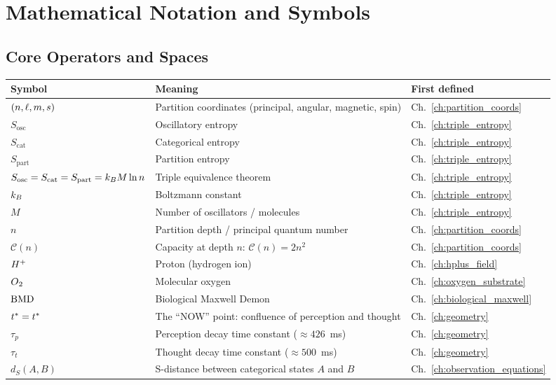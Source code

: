 \chapter{Mathematical Notation and Symbols}
\label{app:notation}

\section{Core Operators and Spaces}

\begin{longtable}{lll}
\toprule
\textbf{Symbol} & \textbf{Meaning} & \textbf{First defined} \\
\midrule
\endhead
$(n,\ell,m,s)$ & Partition coordinates (principal, angular, magnetic, spin) & Ch.~\ref{ch:partition_coords} \\
$S_{\mathrm{osc}}$ & Oscillatory entropy & Ch.~\ref{ch:triple_entropy} \\
$S_{\mathrm{cat}}$ & Categorical entropy & Ch.~\ref{ch:triple_entropy} \\
$S_{\mathrm{part}}$ & Partition entropy & Ch.~\ref{ch:triple_entropy} \\
$S_{\mathrm{osc}} = S_{\mathrm{cat}} = S_{\mathrm{part}} = k_B M \ln n$ & Triple equivalence theorem & Ch.~\ref{ch:triple_entropy} \\
$k_B$ & Boltzmann constant & Ch.~\ref{ch:triple_entropy} \\
$M$ & Number of oscillators / molecules & Ch.~\ref{ch:triple_entropy} \\
$n$ & Partition depth / principal quantum number & Ch.~\ref{ch:partition_coords} \\
$\mathcal{C}(n)$ & Capacity at depth $n$: $\mathcal{C}(n) = 2n^2$ & Ch.~\ref{ch:partition_coords} \\
$H\textsuperscript{+}$ & Proton (hydrogen ion) & Ch.~\ref{ch:hplus_field} \\
$O\textsubscript{2}$ & Molecular oxygen & Ch.~\ref{ch:oxygen_substrate} \\
$\mathrm{BMD}$ & Biological Maxwell Demon & Ch.~\ref{ch:biological_maxwell} \\
$t^{*} = t^*$ & The ``NOW'' point: confluence of perception and thought & Ch.~\ref{ch:geometry} \\
$\tau_p$ & Perception decay time constant ($\approx 426$~ms) & Ch.~\ref{ch:geometry} \\
$\tau_t$ & Thought decay time constant ($\approx 500$~ms) & Ch.~\ref{ch:geometry} \\
$d_S(A,B)$ & S-distance between categorical states $A$ and $B$ & Ch.~\ref{ch:observation_equations} \\

\end{longtable}
